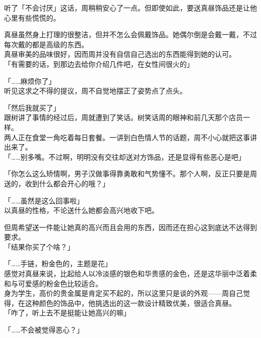 听了「不会讨厌」这话，周稍稍安心了一点。但即使如此，要送真昼饰品还是让他心里有些慌慌的。

真昼虽然身上打理的很整洁，但并不怎么会佩戴饰品。她偶尔倒是会戴一戴，不过每次戴的都是高级的东西。\\

真昼审美的品味很好，因而周并没有自信自己选出的东西能得到她的认可。\\

「有需要的话，到那边去给你介绍几件吧，在女性间很火的」

「……麻烦你了」\\

听见这求之不得的提议，周不自觉地摆正了姿势点了点头。\\

\vspace{2\baselineskip}

「然后我就买了」\\

跟树讲了事情的经过后，周就遭到了笑话。树笑话周的眼神和前几天那个店员一样。\\

两人正在食堂一角吃着每日套餐。一讲到白色情人节的话题，周不小心就把这事讲出来了。\\

「……别多嘴。不过啊，明明没有交往却送对方饰品，还是显得有些恶心是吧」

「你怎么这么矫情啊，男子汉做事得靠勇敢和气势懂不。那个人啊，反正只要是周送的，收到什么都会开心的哦？」

「……虽然是这么回事啦」\\

以真昼的性格，不论送什么她都会高兴地收下吧。

但周希望送一件能让她真的高兴而且会用的东西，因而还在担心这到底达不达得到要求。\\

「结果你买了个啥？」

「……手链，粉金色的，主题是花」\\

感觉对真昼来说，比起给人以冷淡感的银色和华贵感的金色，还是这华丽中泛着柔和与可爱感的粉金色比较适合。\\

身为学生，高价的贵金属是肯定买不起的，所以这里只是谈的外观——周自己觉得，在这种颜色的饰品中，他挑选出的这一款设计精致优美，很适合真昼。\\

「咋了，听上去不是挺能让她高兴的嘛」

「……不会被觉得恶心？」

